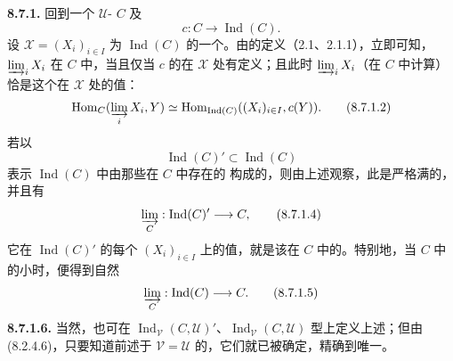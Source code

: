 \textbf{8.7.1.} 回到一个 $\mathcal U$- $C$ 及
\[
c:C\longrightarrow\operatorname{Ind}(C).\tag{8.7.1.1}
\]
设 $\mathcal X=(X_i)_{i\in I}$ 为 $\operatorname{Ind}(C)$ 的一个。由的定义（2.1、2.1.1），立即可知，$\varinjlim_iX_i$ 在 $C$ 中，当且仅当 $c$ 的在 $\mathcal X$ 处有定义；且此时 $\varinjlim_iX_i$（在 $C$ 中计算）恰是这个在 $\mathcal X$ 处的值：
\[
\operatorname{Hom}_C(\varinjlim_iX_i,Y)
\simeq\operatorname{Hom}_{\operatorname{Ind}(C)}((X_i)_{i\in I},c(Y)).\tag{8.7.1.2}
\]
若以
\[
\operatorname{Ind}(C)'\subset\operatorname{Ind}(C)\tag{8.7.1.3}
\]
表示 $\operatorname{Ind}(C)$ 中由那些在 $C$ 中存在的 构成的，则由上述观察，此是严格满的，并且有
\[
\varinjlim_C:\operatorname{Ind}(C)'\longrightarrow C,\tag{8.7.1.4}
\]
它在 $\operatorname{Ind}(C)'$ 的每个 $(X_i)_{i\in I}$ 上的值，就是该在 $C$ 中的。特别地，当 $C$ 中的小时，便得到自然
\[
\varinjlim_C:\operatorname{Ind}(C)\longrightarrow C.\tag{8.7.1.5}
\]
\textbf{8.7.1.6.} 当然，也可在 $\operatorname{Ind}_{\mathcal V}(C,\mathcal U)'$、$\operatorname{Ind}_{\mathcal V}(C,\mathcal U)$ 型上定义上述；但由 (8.2.4.6)，只要知道前述于 $\mathcal V=\mathcal U$ 的，它们就已被确定，精确到唯一。


